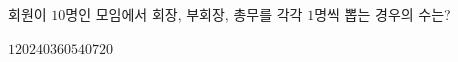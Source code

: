 \hspace*{2mm}\begin{minipage}[t]{\dimexpr\linewidth-2mm\relax}\vspace{0pt}
회원이 $10$명인 모임에서 회장, 부회장, 총무를 각각 $1$명씩 뽑는 경우의 수는?
\begin{choices32}{$120$}{$240$}{$360$}{$540$}{$720$}\end{choices32}\end{minipage}
